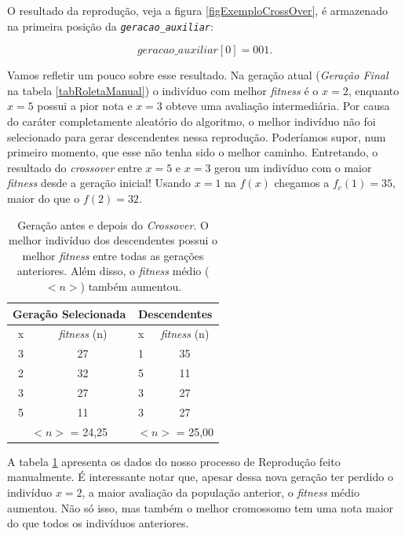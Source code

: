 	O resultado da reprodução, veja a figura \ref{figExemploCrossOver}, é armazenado na primeira posição da \textit{\texttt{geracao\_auxiliar}}:
	
	$$
		geracao\_auxiliar[0] = 001.
	$$
	
	Vamos refletir um pouco sobre esse resultado. Na geração atual (\textit{Geração Final} na tabela \ref{tabRoletaManual}) o indivíduo com melhor \textit{fitness} é o $x = 2$, enquanto $x = 5$ possui a pior nota e $x = 3$ obteve uma avaliação intermediária. Por causa do caráter completamente aleatório do algoritmo, o melhor indivíduo não foi selecionado para gerar descendentes nessa reprodução. Poderíamos supor, num primeiro momento, que esse não tenha sido o melhor caminho. Entretando, o resultado do \textit{crossover} entre $x = 5$ e $x = 3$ gerou um indivíduo com o maior \textit{fitness} desde a geração inicial! Usando $x = 1$ na $f(x)$ chegamos a $f_c(1) = 35$, maior do que o $f(2) = 32$.
	
\begin{table}[htp]
	\caption{\label{tabCrossoverManual}Geração antes e depois do \textit{Crossover}. O melhor indivíduo dos descendentes possui o melhor \textit{fitness} entre todas as gerações anteriores. Além disso, o \textit{fitness} médio ($<n>$) também aumentou.}
	\begin{center}
		\begin{tabular}{c|c|c|c}
			\hline
			\multicolumn{2}{c|}{\textbf{Geração Selecionada}} &  \multicolumn{2}{c}{\textbf{Descendentes}}  \\
			\hline
			x 					& \textit{fitness} (n)	& x						& \textit{fitness} (n)	\\
			\hline
			3 					& 27										& 1						&	35 \\
			2 					& 32 										& 5						&	11 \\
			3 					& 27										& 3						&	27 \\	
			5 					& 11										& 3						&	27\\
			\hline
			\multicolumn{2}{c|}{$<n>$ = 24,25} & \multicolumn{2}{c}{$<n>$ = 25,00}  \\
			\hline
		\end{tabular}
	\end{center}
\end{table}
	
	A tabela \ref{tabCrossoverManual} apresenta os dados do nosso processo de Reprodução feito manualmente. É interessante notar que, apesar dessa nova geração ter perdido o indivíduo $x = 2$, a maior avaliação da população anterior, o \textit{fitness} médio aumentou. Não só isso, mas também o melhor cromossomo tem uma nota maior do que todos os indivíduos anteriores. 
	
